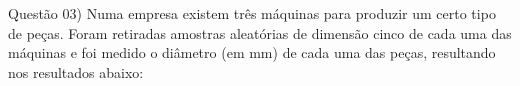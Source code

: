 
\noindent \textcolor{COLOR1}{Questão 03)} Numa empresa existem três máquinas para produzir um certo tipo de peças. Foram retiradas amostras aleatórias de dimensão cinco de cada uma das máquinas e foi medido o diâmetro (em mm) de cada uma das peças, resultando nos resultados abaixo:
\\

